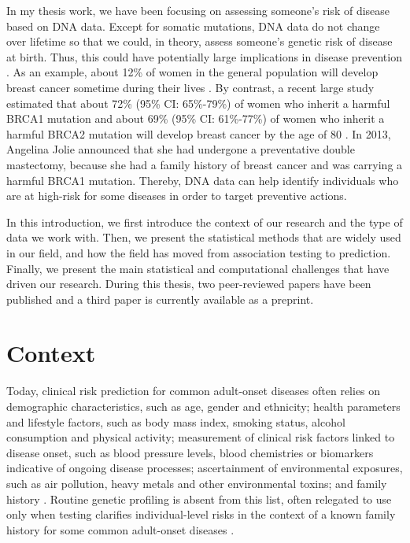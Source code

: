 In my thesis work, we have been focusing on assessing someone's risk of disease based on DNA data. Except for somatic mutations, DNA data do not change over lifetime so that we could, in theory, assess someone's genetic risk of disease at birth. Thus, this could have potentially large implications in disease prevention \cite[]{mavaddat2015prediction,pashayan2015implications}.
As an example, about 12\% of women in the general population will develop breast cancer sometime during their lives \cite[]{desantis2016breast}. By contrast, a recent large study estimated that about 72\% (95\% CI: 65\%-79\%) of women who inherit a harmful BRCA1 mutation and about 69\% (95\% CI: 61\%-77\%) of women who inherit a harmful BRCA2 mutation will develop breast cancer by the age of 80 \cite[]{kuchenbaecker2017risks}. 
In 2013, Angelina Jolie announced that she had undergone a preventative double mastectomy, because she had a family history of breast cancer and was carrying a harmful BRCA1 mutation.
Thereby, DNA data can help identify individuals who are at high-risk for some diseases in order to target preventive actions.

In this introduction, we first introduce the context of our research and the type of data we work with. Then, we present the statistical methods that are widely used in our field, and how the field has moved from association testing to prediction. Finally, we present the main statistical and computational challenges that have driven our research. During this thesis, two peer-reviewed papers have been published and a third paper is currently available as a preprint.

\section{Context}

Today, clinical risk prediction for common adult-onset diseases often relies on demographic characteristics, such as age, gender and ethnicity; health parameters and lifestyle factors, such as body mass index, smoking status, alcohol consumption and physical activity; measurement of clinical risk factors linked to disease onset, such as blood pressure levels, blood chemistries or biomarkers indicative of ongoing disease processes; ascertainment of environmental exposures, such as air pollution, heavy metals and other environmental toxins; and family history \cite[]{torkamani2018personal}.
Routine genetic profiling is absent from this list, often relegated to use only when testing clarifies individual-level risks in the context of a known family history for some common adult-onset
diseases \cite[]{torkamani2018personal}.

